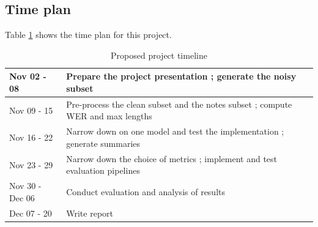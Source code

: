 \documentclass[11pt]{article}
\begin{document}
\subsection{Time plan}

Table \ref{timeplan-table} shows the time plan for this project.

\begin{table}[htbp]
\centering
\begin{tabularx}{\textwidth}{@{}p{2.5cm}>{\raggedright\arraybackslash}X@{}}
Nov 02 - 08          & Prepare the project presentation ; generate the noisy subset\\
\hline
Nov 09 - 15          & Pre-process the clean subset and the notes subset ; compute WER and max lengths\\
\hline
Nov 16 - 22          & Narrow down on one model and test the implementation ; generate summaries\\
\hline
Nov 23 - 29          & Narrow down the choice of metrics ; implement and test evaluation pipelines \\
\hline
Nov 30 - Dec 06 & Conduct evaluation and analysis of results \\
\hline
Dec 07 - 20          & Write report
\end{tabularx}
\caption{Proposed project timeline}
\label{timeplan-table}
\end{table}

\newpage


\end{document}
